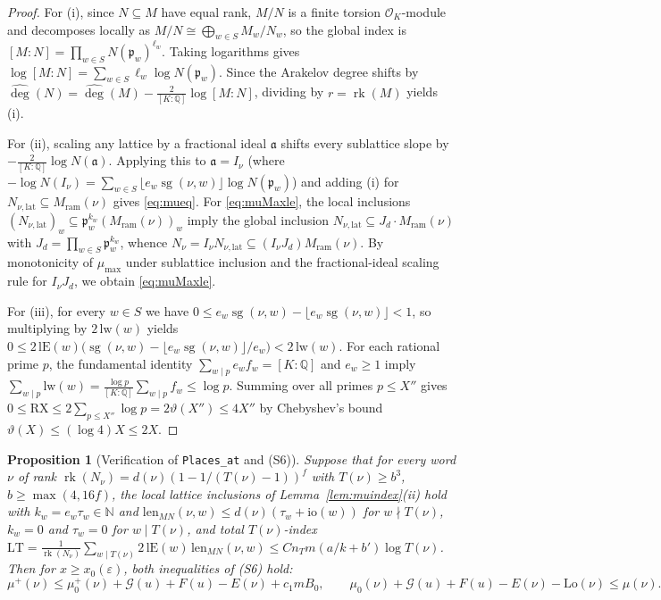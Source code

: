 \documentclass[11pt]{amsart}
\newcommand{\N}{\mathbb{N}}
\newcommand{\Q}{\mathbb{Q}}
\newcommand{\eps}{\varepsilon}
\newcommand{\Oc}{\mathcal{O}}
\newcommand{\fp}{\mathfrak{p}}
\DeclareMathOperator{\rk}{rk}
\theoremstyle{plain}
\newtheorem{proposition}[theorem]{Proposition}
\theoremstyle{definition}
\numberwithin{equation}{section}
\begin{document}
\begin{proof}
For (i), since $N\subseteq M$ have equal rank, $M/N$ is a finite torsion $\Oc_K$-module and
decomposes locally as $M/N\cong\bigoplus_{w\in S}M_w/N_w$, so the global index is
$[M:N]=\prod_{w\in S}N(\fp_w)^{\ell_w}$. Taking logarithms gives
$\log[M:N]=\sum_{w\in S}\ell_w\log N(\fp_w)$. Since the Arakelov degree shifts by
$\widehat\deg(N)=\widehat\deg(M)-\frac{2}{[K:\Q]}\log[M:N]$, dividing by $r=\rk(M)$ yields (i).

For (ii), scaling any lattice by a fractional ideal $\mathfrak a$ shifts every sublattice slope by
$-\frac{2}{[K:\Q]}\log N(\mathfrak a)$. Applying this to $\mathfrak a=I_\nu$ (where
$-\log N(I_\nu)=\sum_{w\in S}\lfloor e_w\operatorname{sg}(\nu,w)\rfloor\log N(\fp_w)$) and adding
(i) for $N_{\nu,\mathrm{lat}}\subseteq M_{\mathrm{ram}}(\nu)$ gives \eqref{eq:mueq}. For
\eqref{eq:muMaxle}, the local inclusions $(N_{\nu,\mathrm{lat}})_w\subseteq\fp_w^{k_w}(M_{\mathrm{ram}}(\nu))_w$
imply the global inclusion $N_{\nu,\mathrm{lat}}\subseteq J_d\cdot M_{\mathrm{ram}}(\nu)$ with
$J_d=\prod_{w\in S}\fp_w^{k_w}$, whence $N_\nu=I_\nu N_{\nu,\mathrm{lat}}\subseteq(I_\nu J_d)M_{\mathrm{ram}}(\nu)$.
By monotonicity of $\mu_{\max}$ under sublattice inclusion and the fractional-ideal scaling rule
for $I_\nu J_d$, we obtain \eqref{eq:muMaxle}.

For (iii), for every $w\in S$ we have $0\le e_w\operatorname{sg}(\nu,w)-\lfloor e_w\operatorname{sg}(\nu,w)\rfloor<1$,
so multiplying by $2\,\mathrm{lw}(w)$ yields
$0\le 2\,\mathrm{lE}(w)\bigl(\operatorname{sg}(\nu,w)-\lfloor e_w\operatorname{sg}(\nu,w)\rfloor/e_w\bigr)<2\,\mathrm{lw}(w)$.
For each rational prime $p$, the fundamental identity $\sum_{w\mid p}e_w f_w=[K:\Q]$ and $e_w\ge 1$
imply $\sum_{w\mid p}\mathrm{lw}(w)=\frac{\log p}{[K:\Q]}\sum_{w\mid p}f_w\le\log p$. Summing over
all primes $p\le X''$ gives $0\le\mathrm{RX}\le 2\sum_{p\le X''}\log p=2\vartheta(X'')\le 4X''$ by
Chebyshev's bound $\vartheta(X)\le(\log 4)X\le 2X$.
\end{proof}

\begin{proposition}[Verification of \texttt{Places\_at} and (S6)]\label{prop:S6}
Suppose that for every word $\nu$ of rank $\rk(N_\nu)=d(\nu)(1-1/(T(\nu)-1))^f$ with
$T(\nu)\ge b^3$, $b\ge\max(4,16f)$, the local lattice inclusions of Lemma~\ref{lem:muindex}(ii)
hold with $k_w=e_w\tau_w\in\N$ and $\mathrm{len}_{MN}(\nu,w)\le d(\nu)(\tau_w+\mathrm{io}(w))$ for
$w\nmid T(\nu)$, $k_w=0$ and $\tau_w=0$ for $w\mid T(\nu)$, and total $T(\nu)$-index
$\mathrm{LT}=\frac{1}{\rk(N_\nu)}\sum_{w\mid T(\nu)}2\,\mathrm{lE}(w)\,\mathrm{len}_{MN}(\nu,w)
\le C n_T m(a/k+b')\log T(\nu)$. Then for $x\ge x_0(\eps)$, both inequalities of \textup{(S6)}
hold:
\[
\mu^+(\nu)\le\mu_0^+(\nu)+\mathcal G(u)+F(u)-E(\nu)+c_1 m B_0,\qquad
\mu_0(\nu)+\mathcal G(u)+F(u)-E(\nu)-\mathrm{Lo}(\nu)\le\mu(\nu).
\]
\end{proposition}
\end{document}
